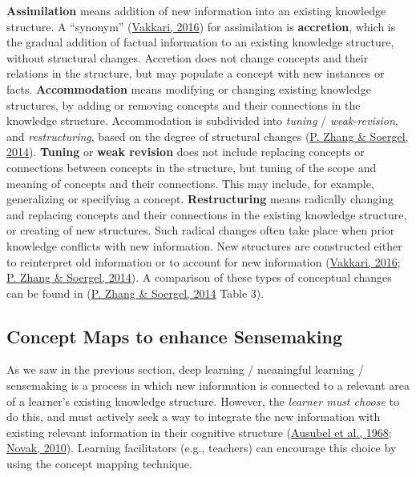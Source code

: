 \documentclass[letterpaper, nobind]{templates/ociamthesis}
\begin{document}
\textbf{Assimilation} means addition of new information into an existing
knowledge structure. A ``synonym'' (\protect\hyperlink{ref-vakkari2016searching}{Vakkari, 2016}) for
assimilation is \textbf{accretion}, which is the gradual addition of factual
information to an existing knowledge structure, without structural
changes. Accretion does not change concepts and their relations in the
structure, but may populate a concept with new instances or facts.
\textbf{Accommodation} means modifying or changing existing knowledge
structures, by adding or removing concepts and their connections in the
knowledge structure. Accommodation is subdivided into \emph{tuning} /
\emph{weak-revision}, and \emph{restructuring}, based on the degree of structural
changes (\protect\hyperlink{ref-zhang2014towards}{P. Zhang \& Soergel, 2014}). \textbf{Tuning} or \textbf{weak revision} does not
include replacing concepts or connections between concepts in the
structure, but tuning of the scope and meaning of concepts and their
connections. This may include, for example, generalizing or specifying a
concept. \textbf{Restructuring} means radically changing and replacing
concepts and their connections in the existing knowledge structure, or
creating of new structures. Such radical changes often take place when
prior knowledge conflicts with new information. New structures are
constructed either to reinterpret old information or to account for new
information (\protect\hyperlink{ref-vakkari2016searching}{Vakkari, 2016}; \protect\hyperlink{ref-zhang2014towards}{P. Zhang \& Soergel, 2014}). A comparison of
these types of conceptual changes can be found in (\protect\hyperlink{ref-zhang2014towards}{P. Zhang \& Soergel, 2014} Table 3).

\hypertarget{sec-bg-concept-maps}{%
\subsection{Concept Maps to enhance Sensemaking}\label{sec-bg-concept-maps}}

As we saw in the previous section, deep learning / meaningful learning /
sensemaking is a process in which new information is connected to a
relevant area of a learner's existing knowledge structure. However, the
\emph{learner must choose} to do this, and must actively seek a way to
integrate the new information with existing relevant information in
their cognitive structure
(\protect\hyperlink{ref-ausubel1968educational}{Ausubel et al., 1968}; \protect\hyperlink{ref-novak2010learninga}{Novak, 2010}). Learning facilitators
(e.g., teachers) can encourage this choice by using the concept mapping
technique.
\end{document}
